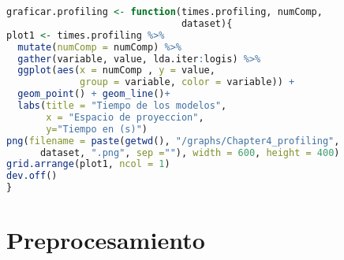 \begin{lstlisting}[language=R, basicstyle=\small]
graficar.profiling <- function(times.profiling, numComp,
                               dataset){
plot1 <- times.profiling %>% 
  mutate(numComp = numComp) %>% 
  gather(variable, value, lda.iter:logis) %>% 
  ggplot(aes(x = numComp , y = value,
             group = variable, color = variable)) +
  geom_point() + geom_line()+
  labs(title = "Tiempo de los modelos", 
       x = "Espacio de proyeccion", 
       y="Tiempo en (s)")
png(filename = paste(getwd(), "/graphs/Chapter4_profiling", 
      dataset, ".png", sep =""), width = 600, height = 400)
grid.arrange(plot1, ncol = 1)
dev.off()
}
\end{lstlisting}

\section{Preprocesamiento}

